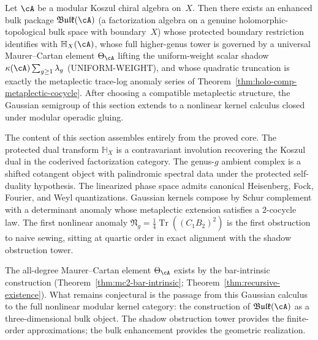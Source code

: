 \begin{conjecture}
\label{conj:holo-comp-bulk-enhancement}
Let $\cA$ be a modular Koszul chiral algebra on~$X$. Then there
exists an enhanced bulk package $\mathfrak{Bulk}(\cA)$ (a
factorization algebra on a genuine holomorphic-topological bulk
space with boundary~$X$) whose protected boundary restriction
identifies with $\mathbb{H}_X(\cA)$, whose full higher-genus tower
is governed by a universal Maurer--Cartan element $\Theta_{\cA}$
lifting the uniform-weight scalar shadow $\kappa(\cA)\sum_{g \geq 1}\lambda_g$ \textup{(UNIFORM-WEIGHT)},
and whose quadratic truncation is exactly the metaplectic trace-log
anomaly series of
Theorem~\textup{\ref{thm:holo-comp-metaplectic-cocycle}}. After
choosing a compatible metaplectic structure, the Gaussian semigroup
of this section extends to a nonlinear kernel calculus closed under
modular operadic gluing.
\end{conjecture}

\begin{remark}
\label{rem:holo-comp-proved-and-frontier}
The content of this section assembles entirely from the proved core.
The protected dual transform $\mathbb{H}_X$ is a contravariant
involution recovering the Koszul dual in the coderived factorization
category. The genus-$g$ ambient complex is a shifted cotangent object
with palindromic spectral data under the protected self-duality
hypothesis. The linearized phase space admits canonical Heisenberg,
Fock, Fourier, and Weyl quantizations. Gaussian kernels compose by
Schur complement with a determinant anomaly whose metaplectic
extension satisfies a $2$-cocycle law. The first nonlinear anomaly
$\mathfrak{N}_g = \tfrac{1}{4}\operatorname{Tr}((C_1 B_2)^2)$ is
the first obstruction to naive sewing, sitting at quartic order in
exact alignment with the shadow obstruction tower.

The all-degree Maurer--Cartan element $\Theta_{\cA}$ exists by the
bar-intrinsic construction
(Theorem~\ref{thm:mc2-bar-intrinsic};
Theorem~\ref{thm:recursive-existence}).
What remains conjectural is the passage from this Gaussian calculus
to the full nonlinear modular kernel category: the construction of
$\mathfrak{Bulk}(\cA)$ as a three-dimensional bulk object.
The shadow obstruction tower provides the finite-order approximations; the bulk
enhancement provides the geometric realization.
\end{remark}

